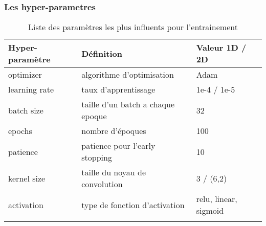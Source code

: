 \begin{frame}
    \frametitle{Les hyper-parametres}

    \begin{table}[h!]
        \scriptsize
        \caption{Liste des paramètres les plus influents pour l'entrainement}
        \label{tab:Parametres}
        \centering
        \begin{tabular}{l l l}
        \toprule
        \textbf{Hyper-paramètre} & \textbf{Définition} & \textbf{Valeur 1D / 2D} \\
        \midrule
        optimizer & algorithme d'optimisation & Adam\\
        learning rate & taux d'apprentissage & 1e-4 / 1e-5\\
        batch size & taille d'un batch a chaque epoque & 32\\
        epochs & nombre d'époques & 100\\
        patience & patience pour l'early stopping & 10\\
        kernel size & taille du noyau de convolution & 3 / (6,2)\\
        activation & type de fonction d'activation  & relu, linear, sigmoid\\
        \bottomrule\\
        \end{tabular}
    \end{table}

\end{frame}



% 
